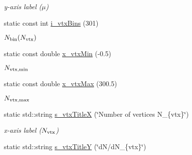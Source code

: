 \begin{CompactItemize}
\begin{CompactList}\small\item\em y-axis label ($\mu$) \item\end{CompactList}\item 
\hypertarget{namespaceHistGroupCfg_f878b34edb8bc063e298c6cc6962de64}{
static const int \hyperlink{namespaceHistGroupCfg_f878b34edb8bc063e298c6cc6962de64}{i\_\-vtx\-Bins} (301)}
\label{namespaceHistGroupCfg_f878b34edb8bc063e298c6cc6962de64}

\begin{CompactList}\small\item\em $N_{\rm bin}(N_{\rm vtx})$ \item\end{CompactList}\item 
\hypertarget{namespaceHistGroupCfg_49e09e9515e1a4471404b67171ce217c}{
static const double \hyperlink{namespaceHistGroupCfg_49e09e9515e1a4471404b67171ce217c}{x\_\-vtx\-Min} (-0.5)}
\label{namespaceHistGroupCfg_49e09e9515e1a4471404b67171ce217c}

\begin{CompactList}\small\item\em $N_{\rm vtx,min}$ \item\end{CompactList}\item 
\hypertarget{namespaceHistGroupCfg_15ed3c22922aeb55f6681480ff251093}{
static const double \hyperlink{namespaceHistGroupCfg_15ed3c22922aeb55f6681480ff251093}{x\_\-vtx\-Max} (300.5)}
\label{namespaceHistGroupCfg_15ed3c22922aeb55f6681480ff251093}

\begin{CompactList}\small\item\em $N_{\rm vtx,max}$ \item\end{CompactList}\item 
\hypertarget{namespaceHistGroupCfg_0bfe487593afc21f8d3a4df0c08bcdf8}{
static std::string \hyperlink{namespaceHistGroupCfg_0bfe487593afc21f8d3a4df0c08bcdf8}{s\_\-vtx\-Title\-X} (\char`\"{}Number of vertices N\_\-\{vtx\}\char`\"{})}
\label{namespaceHistGroupCfg_0bfe487593afc21f8d3a4df0c08bcdf8}

\begin{CompactList}\small\item\em x-axis label ($N_{\rm vtx}$) \item\end{CompactList}\item 
\hypertarget{namespaceHistGroupCfg_afe371fed0e0641ef349c35d1f508ca6}{
static std::string \hyperlink{namespaceHistGroupCfg_afe371fed0e0641ef349c35d1f508ca6}{s\_\-vtx\-Title\-Y} (\char`\"{}d\-N/d\-N\_\-\{vtx\}\char`\"{})}
\label{namespaceHistGroupCfg_afe371fed0e0641ef349c35d1f508ca6}


\end{CompactItemize}
